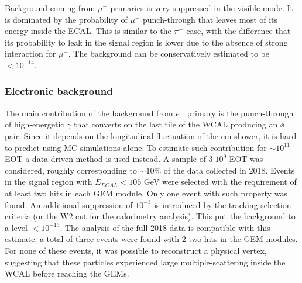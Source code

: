 Background coming from $\mu^-$ primaries is very suppressed in the visible mode. It is dominated by the probability of $\mu^-$ punch-through that leaves most of its energy inside the ECAL. This is similar to the $\pi^-$ case, with the difference that its probability to leak in the signal region is lower due to the absence of strong interaction for $\mu^-$. The background can be conservatively estimated to be $<10^{-14}$.

\subsubsection{Electronic background}
\label{ch3:sec:bkg:vis:elec}

The main contribution of the background from $e^-$ primary is the punch-through of high-energetic $\gamma$ that converts on the last tile of the WCAL producing an $\ee$ pair. Since it depends on the longitudinal fluctuation of the em-shower, it is hard to predict using MC-simulations alone. To estimate such contribution for $\sim10^{11}$ EOT a data-driven method is used instead. A sample of 3$\cdot 10^9$ EOT was considered, roughly corresponding to $\sim$10\% of the data collected in 2018. Events in the signal region with $E_{ECAL} < 105$ GeV were selected with the requirement of at least two hits in each GEM module. Only one event with such property was found. An additional suppression of $10^{-3}$ is introduced by the tracking selection criteria (or the W2 cut for the calorimetry analysis). This put the background to a level $<10^{-13}$. The analysis of the full 2018 data is compatible with this estimate: a total of three events were found with 2 two hits in the GEM modules. For none of these events, it was possible to reconstruct a physical vertex, suggesting that these particles experienced large multiple-scattering inside the WCAL before reaching the GEMs.


